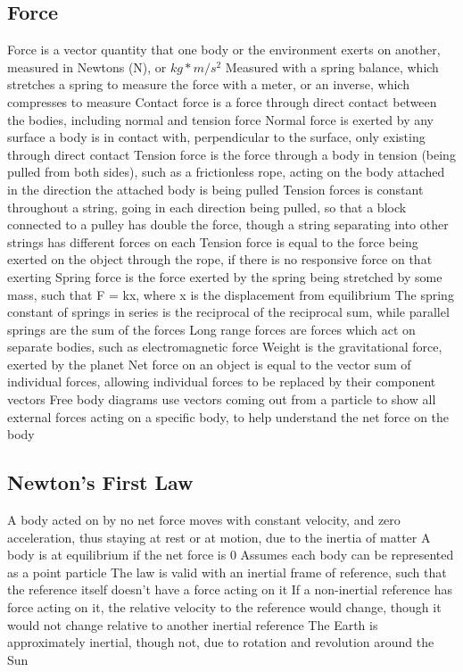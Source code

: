 \documentclass[11 pt, twoside]{article}
\newenvironment{outline*}
{
	\begin{outline}[enumerate]
	}
	{\end{outline}
}
\begin{document}
\subsection{Force}
\begin{outline*}
\1 Force is a vector quantity that one body or the environment exerts on another, measured in Newtons (N), or $kg*m/s^2$
\2 Measured with a spring balance, which stretches a spring to measure the force with a meter, or an inverse, which compresses to measure
\1 Contact force is a force through direct contact between the bodies, including normal and tension force
\2 Normal force is exerted by any surface a body is in contact with, perpendicular to the surface, only existing through direct contact
\1 Tension force is the force through a body in tension (being pulled from both sides), such as a frictionless rope, acting on the body attached in the direction the attached body is being pulled
\2 Tension forces is constant throughout a string, going in each direction being pulled, so that a block connected to a pulley has double the force, though a string separating into other strings has different forces on each
\2 Tension force is equal to the force being exerted on the object through the rope, if there is no responsive force on that exerting
\1 Spring force is the force exerted by the spring being stretched by some mass, such that F = kx, where x is the displacement from equilibrium
\2 The spring constant of springs in series is the reciprocal of the reciprocal sum, while parallel springs are the sum of the forces
\1 Long range forces are forces which act on separate bodies, such as electromagnetic force
\2 Weight is the gravitational force, exerted by the planet
\1 Net force on an object is equal to the vector sum of individual forces, allowing individual forces to be replaced by their component vectors
\1 Free body diagrams use vectors coming out from a particle to show all external forces acting on a specific body, to help understand the net force on the body
\end{outline*}
\subsection{Newton’s First Law}
\begin{outline*}
\1 A body acted on by no net force moves with constant velocity, and zero acceleration, thus staying at rest or at motion, due to the inertia of matter
\2 A body is at equilibrium if the net force is 0
\2 Assumes each body can be represented as a point particle
\1 The law is valid with an inertial frame of reference, such that the reference itself doesn’t have a force acting on it
\2 If a non-inertial reference has force acting on it, the relative velocity to the reference would change, though it would not change relative to another inertial reference
\2 The Earth is approximately inertial, though not, due to rotation and revolution around the Sun
\end{outline*}
\end{document}
